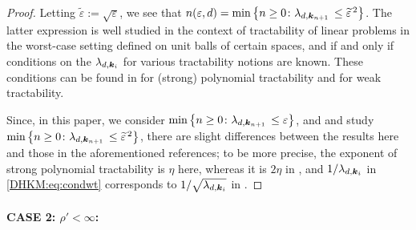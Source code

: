 \documentclass[USenglish]{article}
\theoremstyle{dgthm}
\theoremstyle{dgthm}
\theoremstyle{dgthm}
\theoremstyle{dgthm}
\theoremstyle{dgdef}
\theoremstyle{definition}
\begin{document}
\begin{proof}
Letting $\widetilde{\varepsilon}:=\sqrt{\varepsilon}$, we see that 
$n(\varepsilon,d)=\min \left \{n\geq 0\colon \lambda_{d,{\boldsymbol{k}}_{n+1}} \,\leq \widetilde{\varepsilon}^{\,2} \right \}$. The latter expression is well studied in the context of tractability of linear problems in the worst-case setting defined on unit balls of certain spaces, and if and only if conditions on the $\lambda_{d,{\boldsymbol{k}}_i}$ for various tractability notions are known. These conditions can be found in \cite[Chapter 5]{NovWoz08a} for (strong) polynomial tractability and  \cite{WerWoz17} for weak tractability.

Since, in this paper, we consider $\min \left \{n\geq 0\colon \lambda_{d,{\boldsymbol{k}}_{n+1}} \,\leq \varepsilon \right \}$, and \cite{NovWoz08a} and
\cite{WerWoz17} study $\min \left \{n\geq 0\colon \lambda_{d,{\boldsymbol{k}}_{n+1}} \,\leq \widetilde{\varepsilon}^{\,2} \right \}$, 
there are slight differences between the results here and those in the aforementioned references; to be more precise, the exponent of strong polynomial tractability is $\eta$ here, whereas it is $2\eta$ in \cite{NovWoz08a}, and $1/\lambda_{d,{\boldsymbol{k}}_i}$ in \eqref{DHKM:eq:condwt} corresponds to $1/\sqrt{\lambda_{d,{\boldsymbol{k}}_i}}$ in \cite{WerWoz17}. 
\end{proof}

\paragraph*{CASE 2: $\rho'<\infty$:} 
\end{document}
